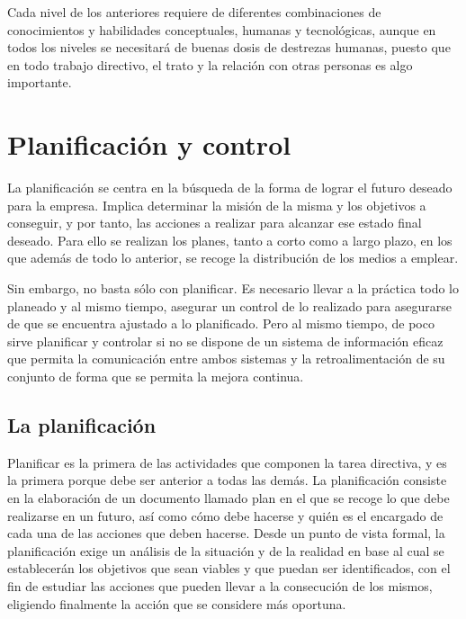 \documentclass[
]{krantz}
\begin{document}
Cada nivel de los anteriores requiere de diferentes combinaciones de conocimientos y habilidades conceptuales, humanas y tecnológicas, aunque en todos los niveles se necesitará de buenas dosis de destrezas humanas, puesto que en todo trabajo directivo, el trato y la relación con otras personas es algo importante.

\hypertarget{planificaciuxf3n-y-control}{%
\chapter{Planificación y control}\label{planificaciuxf3n-y-control}}

La planificación se centra en la búsqueda de la forma de lograr el futuro deseado para la empresa. Implica determinar la misión de la misma y los objetivos a conseguir, y por tanto, las acciones a realizar para alcanzar ese estado final deseado. Para ello se realizan los planes, tanto a corto como a largo plazo, en los que además de todo lo anterior, se recoge la distribución de los medios a emplear.

Sin embargo, no basta sólo con planificar. Es necesario llevar a la práctica todo lo planeado y al mismo tiempo, asegurar un control de lo realizado para asegurarse de que se encuentra ajustado a lo planificado. Pero al mismo tiempo, de poco sirve planificar y controlar si no se dispone de un sistema de información eficaz que permita la comunicación entre ambos sistemas y la retroalimentación de su conjunto de forma que se permita la mejora continua.

\hypertarget{la-planificaciuxf3n}{%
\section{La planificación}\label{la-planificaciuxf3n}}

Planificar es la primera de las actividades que componen la tarea directiva, y es la primera porque debe ser anterior a todas las demás. La planificación consiste en la elaboración de un documento llamado plan en el que se recoge lo que debe realizarse en un futuro, así como cómo debe hacerse y quién es el encargado de cada una de las acciones que deben hacerse. Desde un punto de vista formal, la planificación exige un análisis de la situación y de la realidad en base al cual se establecerán los objetivos que sean viables y que puedan ser identificados, con el fin de estudiar las acciones que pueden llevar a la consecución de los mismos, eligiendo finalmente la acción que se considere más oportuna.
\end{document}
